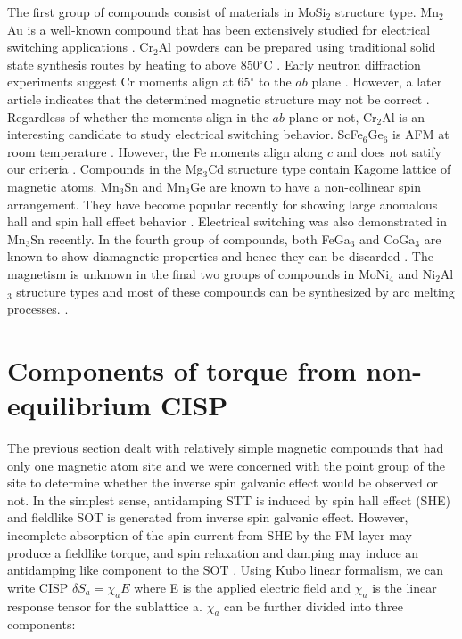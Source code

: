 \documentclass[10pt,doublespacing,edeposit]{uiucthesis2020}
\begin{document}
\begin{mainmatter}

The first group of compounds consist of materials in MoSi$_2$ structure type. Mn$_2$Au is a well-known compound that has been extensively studied for electrical switching applications \cite{Meinert2018,Bodnar2019}. Cr$_2$Al powders can be prepared using traditional solid state synthesis routes by heating to above 850$^\circ$C \cite{Susner2015}. Early neutron diffraction experiments suggest Cr moments align at 65$^\circ$ to the $ab$ plane \cite{Atoji1965}. However, a later article indicates that the determined magnetic structure may not be correct \cite{Kallel1967}. Regardless of whether the moments align in the $ab$ plane or not, Cr$_2$Al is an interesting candidate to study electrical switching behavior. ScFe$_6$Ge$_6$ is AFM at room temperature \cite{Venturini1992}. However, the Fe moments align along $c$ and does not satify our criteria \cite{Mazet2000}. Compounds in the Mg$_3$Cd structure type contain Kagome lattice of magnetic atoms. Mn$_3$Sn and Mn$_3$Ge are known to have a non-collinear spin arrangement. They have become popular recently for showing large anomalous hall and spin hall effect behavior \cite{Nakatsuji2015,Kubler2014,Kimata2019}. Electrical switching was also demonstrated in Mn$_3$Sn recently. In the fourth group of compounds, both FeGa$_3$ and CoGa$_3$ are known to show diamagnetic properties and hence they can be discarded \cite{Haussermann2002,Viklund2002,Zhang2017}. The magnetism is unknown in the final two groups of compounds in MoNi$_4$ and Ni$_2$Al$_3$ structure types and most of these compounds can be synthesized by arc melting processes. \cite{Harker1944,Taylor1972}.

\section{Components of torque from non-equilibrium CISP}


The previous section dealt with relatively simple magnetic compounds that had only one magnetic atom site and we were concerned with the point group of the site to determine whether the inverse spin galvanic effect would be observed or not. In the simplest sense, antidamping STT is induced by spin hall effect (SHE) and fieldlike SOT is generated from inverse spin galvanic effect. However, incomplete absorption of the spin current from SHE by the FM layer may produce a fieldlike torque, and spin relaxation and damping may induce an antidamping like component to the SOT \cite{Zelezny2017}. Using Kubo linear formalism, we can write CISP $\delta S_a = \chi_a E$ where E is the applied electric field and $\chi_a$ is the linear response tensor for the sublattice a. $\chi_a$ can be further divided into three components:


\end{mainmatter}
\end{document}
